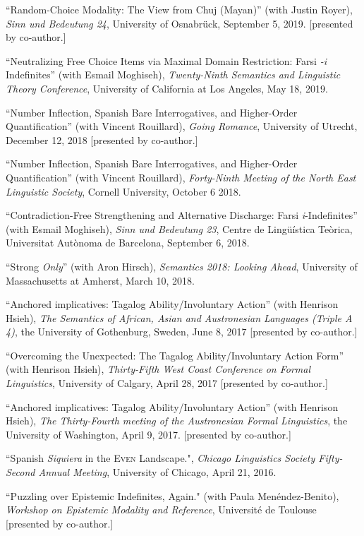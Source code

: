 \documentclass[11pt]{article}
\begin{document}
``Random-Choice Modality: The View from Chuj (Mayan)'' (with Justin Royer), \textit{Sinn und Bedeutung 24}, University of Osnabr\"{u}ck, September 5, 2019. [presented by co-author.]

``Neutralizing Free Choice Items via Maximal Domain Restriction: Farsi \textit{-i} Indefinites'' (with Esmail Moghiseh), \textit{Twenty-Ninth Semantics and Linguistic Theory Conference}, University of California at Los Angeles, May 18, 2019.

``Number Inflection, Spanish Bare Interrogatives, and Higher-Order Quantification'' (with Vincent Rouillard), \textit{Going Romance}, University of Utrecht, December 12, 2018 [presented by co-author.]

``Number Inflection, Spanish Bare Interrogatives, and Higher-Order Quantification'' (with Vincent Rouillard), \textit{Forty-Ninth
  Meeting of the North East Linguistic Society}, Cornell University, October 6 2018.

``Contradiction-Free Strengthening and Alternative Discharge: Farsi \textit{i}-Indefinites'' (with Esmail Moghiseh), \textit{Sinn und Bedeutung 23}, Centre de Ling\"{u}\'istica Te\`orica, Universitat Aut\`onoma de Barcelona, September 6, 2018.
 
``Strong \textit{Only}'' (with Aron Hirsch), \textit{Semantics 2018: Looking Ahead}, University of Massachusetts at Amherst, March 10, 2018.
 

``Anchored implicatives: Tagalog Ability/Involuntary Action'' (with Henrison Hsieh), \textit{The Semantics of African, Asian and Austronesian Languages (Triple A 4)}, the University of Gothenburg, Sweden, June 8, 2017 [presented by co-author.]

``Overcoming the Unexpected: The Tagalog Ability/Involuntary Action Form'' (with Henrison Hsieh),  \textit{Thirty-Fifth West Coast Conference on Formal Linguistics}, University of Calgary, April 28, 2017 [presented by co-author.]


``Anchored implicatives: Tagalog Ability/Involuntary Action'' (with Henrison Hsieh), \textit{The Thirty-Fourth meeting of the Austronesian Formal Linguistics}, the University of Washington, April 9, 2017. [presented by co-author.]

``Spanish \textit{Siquiera} in the \textsc{Even} Landscape.", \textit{Chicago Linguistics Society Fifty-Second Annual Meeting}, University of Chicago, April 21, 2016. 

``Puzzling over Epistemic Indefinites, Again." (with Paula
Men\'endez-Benito), \textit{Workshop on Epistemic Modality and Reference}, Universit\'e de Toulouse [presented by co-author.]
\end{document}
